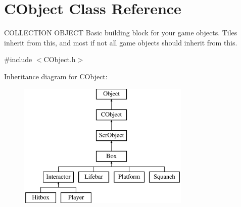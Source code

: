 \hypertarget{class_c_object}{}\section{C\+Object Class Reference}
\label{class_c_object}


C\+O\+L\+L\+E\+C\+T\+I\+ON O\+B\+J\+E\+CT Basic building block for your game objects. Tiles inherit from this, and most if not all game objects should inherit from this.  




{\ttfamily \#include $<$C\+Object.\+h$>$}

Inheritance diagram for C\+Object\+:\begin{figure}[H]
\begin{center}
\leavevmode
\includegraphics[height=6.000000cm]{class_c_object}
\end{center}
\end{figure}
